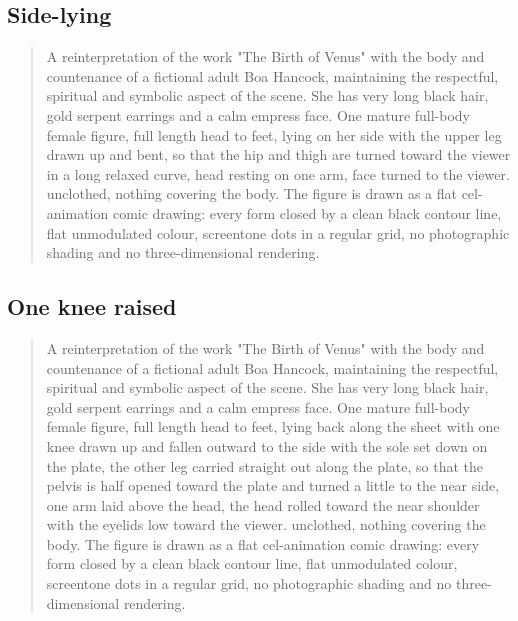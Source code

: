 \subsection{Side-lying}
\begin{quote}
A reinterpretation of the work "The Birth of Venus" with the body and countenance of a fictional adult Boa Hancock, maintaining the respectful, spiritual and symbolic aspect of the scene. She has very long black hair, gold serpent earrings and a calm empress face. One mature full-body female figure, full length head to feet, lying on her side with the upper leg drawn up and bent, so that the hip and thigh are turned toward the viewer in a long relaxed curve, head resting on one arm, face turned to the viewer. unclothed, nothing covering the body. The figure is drawn as a flat cel-animation comic drawing: every form closed by a clean black contour line, flat unmodulated colour, screentone dots in a regular grid, no photographic shading and no three-dimensional rendering. 
\end{quote}

\subsection{One knee raised}
\begin{quote}
A reinterpretation of the work "The Birth of Venus" with the body and countenance of a fictional adult Boa Hancock, maintaining the respectful, spiritual and symbolic aspect of the scene. She has very long black hair, gold serpent earrings and a calm empress face. One mature full-body female figure, full length head to feet, lying back along the sheet with one knee drawn up and fallen outward to the side with the sole set down on the plate, the other leg carried straight out along the plate, so that the pelvis is half opened toward the plate and turned a little to the near side, one arm laid above the head, the head rolled toward the near shoulder with the eyelids low toward the viewer. unclothed, nothing covering the body. The figure is drawn as a flat cel-animation comic drawing: every form closed by a clean black contour line, flat unmodulated colour, screentone dots in a regular grid, no photographic shading and no three-dimensional rendering. 
\end{quote}
